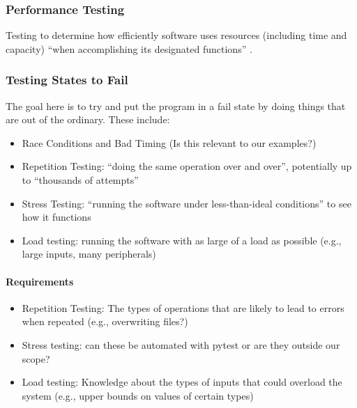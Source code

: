 \subsubsection{Performance Testing}

Testing to determine how efficiently software uses resources (including time
and capacity) ``when accomplishing its designated functions''
\citepISTQB{}. 



\subsubsection[Testing States to Fail]{Testing States to Fail
      \citep[pp.~84-87]{Patton2006}}

The goal here is to try and put the program in a fail state by doing things
that are out of the ordinary. These include:

\begin{itemize}
      \item Race Conditions and Bad Timing \citep[pp.~85-86]{Patton2006}
            (Is this relevant to our examples?)
      \item Repetition Testing: ``doing the same operation over and over'',
            potentially up to ``thousands of attempts''
            \citep[p.~86]{Patton2006}
      \item Stress Testing: ``running the software under less-than-ideal
            conditions'' to see how it functions \citep[p.~86]{Patton2006}
      \item Load testing: running the software with as large of a load as
            possible (e.g., large inputs, many peripherals)
            \citep[p.~86]{Patton2006}
\end{itemize}

\paragraph{Requirements}
\begin{itemize}
      \item Repetition Testing: The types of operations that are likely to lead
            to errors when repeated (e.g., overwriting files?)
      \item Stress testing: can these be automated with pytest or are they
            outside our scope? 
      \item Load testing: Knowledge about the types of inputs that could
            overload the system (e.g., upper bounds on values of certain types)
\end{itemize}


